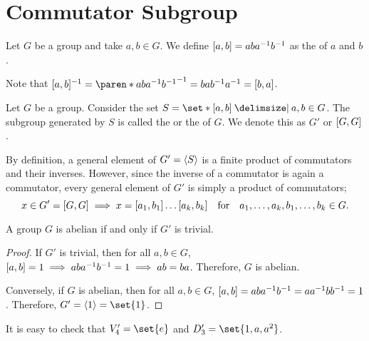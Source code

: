 \documentclass[11pt]{penrose}
\begin{document}
\section{Commutator Subgroup}
\begin{ndfn}
    Let $G$ be a group and take $a,b \in G$. We define $\lbrack a,b\rbrack = aba^{-1}b^{-1}$ as the  of $a$ and $b$.
\end{ndfn}

Note that $\comm{a,b}^{-1} = \paren*{aba^{-1}b^{-1}}^{-1} = bab^{-1}a^{-1} = \comm{b,a}$.

\begin{ndfn}
    Let $G$ be a group. Consider the set $S = \set*{ \comm{a,b} \st a,b \in G }$. The subgroup generated by $S$ is called the  or the  of $G$. We denote this as $G'$ or $\lbrack G,G\rbrack$.
\end{ndfn}

By definition, a general element of $G'=\langle S\rangle$ is a finite product of commutators and their inverses. However, since the inverse of a commutator is again a commutator, every general element of $G'$ is simply a product of commutators;
\begin{equation*}
    x \in G' = \lbrack G,G\rbrack
    \implies
    x = \lbrack a_{1}, b_{1}\rbrack \dots \lbrack a_{k}, b_{k}\rbrack
    \quad\text{for}\quad a_{1}, \dots, a_{k}, b_{1}, \dots, b_{k} \in G.
\end{equation*}

\begin{nthm}
    A group $G$ is abelian if and only if $G'$ is trivial.
\end{nthm}
\begin{proof}
    If $G'$ is trivial, then for all $a, b \in G$, $\lbrack a,b\rbrack = 1 \implies aba^{-1}b^{-1} = 1 \implies ab = ba$. Therefore, $G$ is abelian.

    Conversely, if $G$ is abelian, then for all $a,b \in G$, $\lbrack a,b\rbrack = aba^{-1}b^{-1} = aa^{-1}bb^{-1} = 1$. Therefore, $G' = \cyclic{1} = \set{1}$.
\end{proof}

\begin{negg}
    It is easy to check that $V_{4}' = \set{e}$ and $D_{3}' = \set{1, a, a^{2}}$.
\end{negg}
\end{document}
